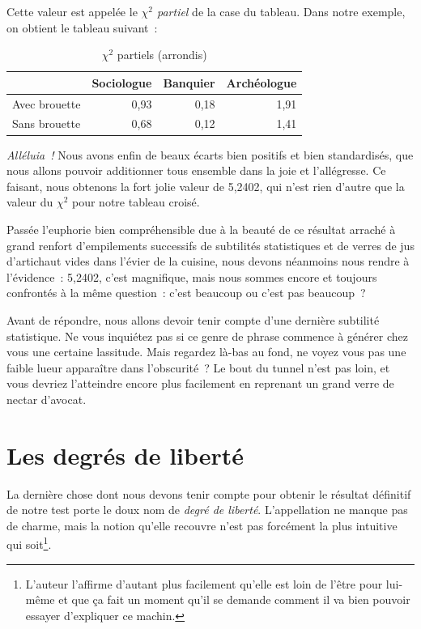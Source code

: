 \documentclass[a4paper,10pt,twoside,francais]{report}
\newcommand{\chid}{$\chi^2$\xspace}
\begin{document}
Cette valeur est appelée le \textit{\chid partiel} de la case du
tableau. Dans notre exemple, on obtient le tableau suivant~:

\begin{table}[H]
  \begin{center}
    \begin{tabular}{lrrr}
      \toprule
      & Sociologue & Banquier & Archéologue\\
      \midrule
      Avec brouette &  0,93 & 0,18 & 1,91\\
      Sans brouette &  0,68 & 0,12 & 1,41\\
      \bottomrule
    \end{tabular}
    \caption{\chid partiels (arrondis)}
    \label{chidpart}
  \end{center}
\end{table}

\textit{Alléluia~!} Nous avons enfin de beaux écarts bien positifs et bien
standardisés, que nous allons pouvoir additionner tous ensemble dans
la joie et l'allégresse. Ce faisant, nous obtenons la fort jolie valeur
de 5,2402, qui n'est rien d'autre que la valeur du \chid pour notre
tableau croisé.

Passée l'euphorie bien compréhensible due à la beauté de ce résultat
arraché à grand renfort d'empilements successifs de subtilités
statistiques et de verres de jus d'artichaut vides dans l'évier de la
cuisine, nous devons néanmoins nous rendre à l'évidence~: 5,2402,
c'est magnifique, mais nous sommes encore et toujours confrontés à la
même question~: c'est beaucoup ou c'est pas beaucoup~?

Avant de répondre, nous allons devoir tenir compte d'une dernière
subtilité statistique. Ne vous inquiétez pas si ce genre de phrase
commence à générer chez vous une certaine lassitude. Mais regardez
là-bas au fond, ne voyez vous pas une faible lueur apparaître dans
l'obscurité~? Le bout du tunnel n'est pas loin, et vous devriez
l'atteindre encore plus facilement en reprenant un grand verre de
nectar d'avocat.



\section{Les degrés de liberté}
\label{ssec-ddl}

La dernière chose dont nous devons tenir compte pour obtenir le
résultat définitif de notre test porte le doux nom de \textit{degré de
liberté}. L'appellation ne manque pas de charme, mais la notion
qu'elle recouvre n'est pas forcément la plus intuitive qui
soit\footnote{L'auteur l'affirme d'autant plus facilement qu'elle est
  loin de l'être pour lui-même et que ça fait un moment qu'il se
  demande comment il va bien pouvoir essayer d'expliquer ce machin.}.
\end{document}
